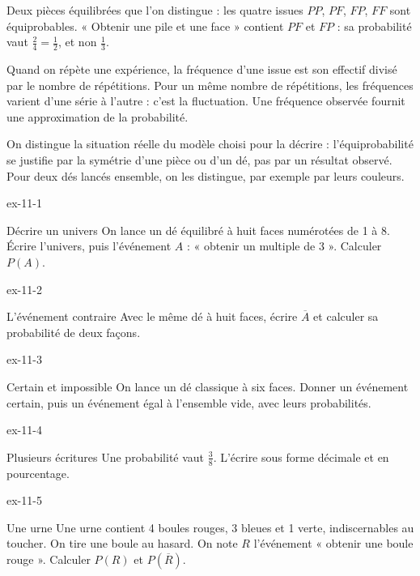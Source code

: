 \begin{exemple}Deux pièces équilibrées que l’on distingue : les quatre issues $PP$, $PF$, $FP$, $FF$ sont équiprobables. « Obtenir une pile et une face » contient $PF$ et $FP$ : sa probabilité vaut $\frac24=\frac12$, et non $\frac13$.\end{exemple}
\begin{definition}Quand on répète une expérience, la fréquence d’une issue est son effectif divisé par le nombre de répétitions. Pour un même nombre de répétitions, les fréquences varient d’une série à l’autre : c’est la fluctuation. Une fréquence observée fournit une approximation de la probabilité.\end{definition}
\begin{attention}On distingue la situation réelle du modèle choisi pour la décrire : l’équiprobabilité se justifie par la symétrie d’une pièce ou d’un dé, pas par un résultat observé. Pour deux dés lancés ensemble, on les distingue, par exemple par leurs couleurs.\end{attention}

\clearpage{}
\begin{blocLivre}{ex-11-1}\begin{exercice}[1]{Décrire un univers}
On lance un dé équilibré à huit faces numérotées de 1 à 8. Écrire l’univers, puis l’événement $A$ : « obtenir un multiple de 3 ». Calculer $P(A)$.
\end{exercice}\end{blocLivre}
\begin{blocLivre}{ex-11-2}\begin{exercice}[1]{L’événement contraire}
Avec le même dé à huit faces, écrire $\overline{A}$ et calculer sa probabilité de deux façons.
\end{exercice}\end{blocLivre}
\begin{blocLivre}{ex-11-3}\begin{exercice}[1]{Certain et impossible}
On lance un dé classique à six faces. Donner un événement certain, puis un événement égal à l’ensemble vide, avec leurs probabilités.
\end{exercice}\end{blocLivre}
\begin{blocLivre}{ex-11-4}\begin{exercice}[1]{Plusieurs écritures}
Une probabilité vaut $\frac38$. L’écrire sous forme décimale et en pourcentage.
\end{exercice}\end{blocLivre}
\begin{blocLivre}{ex-11-5}\begin{exercice}[1]{Une urne}
Une urne contient 4 boules rouges, 3 bleues et 1 verte, indiscernables au toucher. On tire une boule au hasard. On note $R$ l’événement « obtenir une boule rouge ». Calculer $P(R)$ et $P(\overline R)$.
\label{fig-ex-11-5}
\end{exercice}\end{blocLivre}

